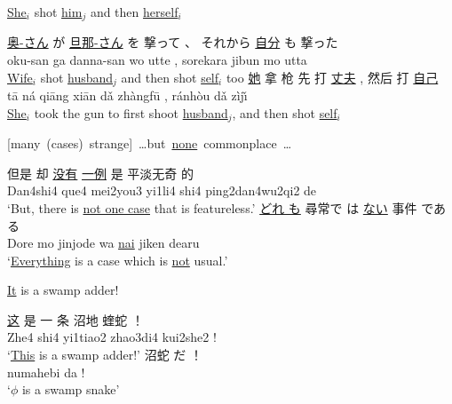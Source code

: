 \documentclass[a4paper,landscape,headrule,footrule,xetex]{foils}
\begin{document}
\begin{exe}
  \ex \ul{She}$_i$ shot \ul{him}$_j$ and then \ul{herself}$_i$
  \begin{xlist}
    \ex \gll \ul{奥-さん} が \ul{旦那-さん} を 撃って 、 それから \ul{自分} も 撃った \\
    oku-san ga danna-san wo utte , sorekara jibun mo utta \\
    \trans \ul{Wife}$_i$ shot \ul{husband}$_j$ and then shot \ul{self}$_i$ too
    \ex  \gll \ul{她} 拿 枪  先 打 \ul{丈夫} , 然后 打 \ul{自己}\\
    t\={a} ná qi\={a}ng xi\={a}n d\v{a} zhàngf\={u} , ránh\`{o}u d\v{a} zìj\v{\i} \\
    \trans \ul{She}$_i$ took the gun to first shoot \ul{husband}$_j$, and then shot \ul{self}$_i$
  \end{xlist}
\newpage

\ex\label{s:none}    \mbox{[many (cases) strange] \ldots but \ul{none} commonplace \ldots}
\begin{xlist}
  \ex \gll      但是    却   \ul{没有}    \ul{一例} 是  平淡无奇      的 \\
  Dan4shi4 que4 mei2you3 yi1li4 shi4 ping2dan4wu2qi2 de \\
  \trans ‘But, there is \ul{not  one case} that is featureless.’
  \ex \gll  \ul{どれ も} 尋常で は \ul{ない} 事件 である \\
  {Dore mo}   jinjode   wa \ul{nai}    jiken dearu \\
  \trans ‘\ul{Everything} is a case which is \ul{not} usual.’
\end{xlist}
  \ex\label{s:dif}  \ul{It} is a swamp adder!
  \begin{xlist}
    \ex \gll \ul{这}     是   一 条      沼地        蝰蛇 ！ \\
    Zhe4 shi4 yi1tiao2 zhao3di4 kui2she2 ! \\
    \trans `\ul{This} is a swamp adder!'
    \ex \gll  沼蛇 だ ！ \\
    numahebi da ! \\
    \trans `\ul{$\phi$} is a swamp snake'
  \end{xlist}
\end{exe}
 
\end{document}

